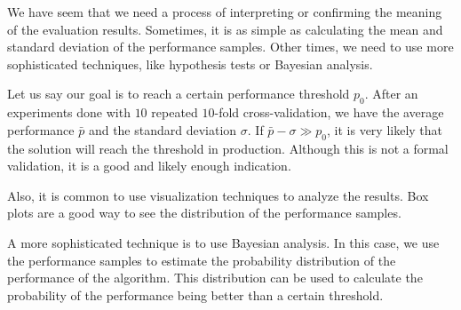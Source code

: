 We have seem that we need a process of interpreting or confirming the meaning of the
evaluation results.
Sometimes, it is as simple as calculating the mean and standard deviation of the
performance samples.  Other times, we need to use more sophisticated techniques, like
hypothesis tests or Bayesian analysis.

Let us say our goal is to reach a certain performance threshold $p_0$.  After an
experiments done with $10$ repeated $10$-fold cross-validation, we have the average
performance $\bar{p}$ and the standard deviation $\sigma$.  If $\bar{p} - \sigma \gg
p_0$, it is very likely that the solution will reach the threshold in production.
Although this is not a formal validation, it is a good and likely enough indication.

Also, it is common to use visualization techniques to analyze the results.  Box plots are
a good way to see the distribution of the performance samples.

A more sophisticated technique is to use Bayesian analysis.  In this case, we use the
performance samples to estimate the probability distribution of the performance of the
algorithm.  This distribution can be used to calculate the probability of the performance
being better than a certain threshold.

